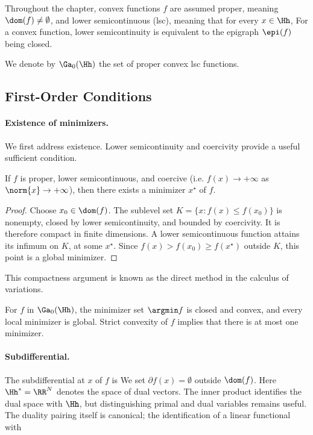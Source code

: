Throughout the chapter, convex functions $f$ are assumed proper, meaning $\dom(f) \neq \emptyset$, and lower semicontinuous (lsc), meaning that for every $x \in \Hh$,
For a convex function, lower semicontinuity is equivalent to the epigraph $\epi(f)$ being closed.
 
We denote by $\Ga_0(\Hh)$ the set of proper convex lsc functions.

                                                                                  
\subsection{First-Order Conditions}

   
\paragraph{Existence of minimizers.}

We first address existence. Lower semicontinuity and coercivity provide a useful sufficient condition.

\begin{prop}
	If $f$ is proper, lower semicontinuous, and coercive (i.e. $f(x)\rightarrow +\infty$ as $\norm{x}\rightarrow +\infty$), then there exists a minimizer $x^\star$ of $f$.
\end{prop}

\begin{proof}
Choose $x_0\in\dom(f)$. The sublevel set $K=\{x:f(x)\leq f(x_0)\}$ is nonempty, closed by lower semicontinuity, and bounded by coercivity. It is therefore compact in finite dimensions. A lower semicontinuous function attains its infimum on $K$, at some $x^\star$. Since $f(x)>f(x_0)\geq f(x^\star)$ outside $K$, this point is a global minimizer.
\end{proof}

This compactness argument is known as the direct method in the calculus of variations.
 
For $f$ in $\Ga_0(\Hh)$, the minimizer set $\argmin f$ is closed and convex, and every local minimizer is global. Strict convexity of $f$ implies that there is at most one minimizer.

   
\paragraph{Subdifferential.}

The subdifferential at $x$ of $f$ is
We set $\partial f(x)=\emptyset$ outside $\dom(f)$. Here $\Hh^*=\RR^N$ denotes the space of dual vectors. The inner product identifies the dual space with $\Hh$, but distinguishing primal and dual variables remains useful. The duality pairing itself is canonical; the identification of a linear functional with 